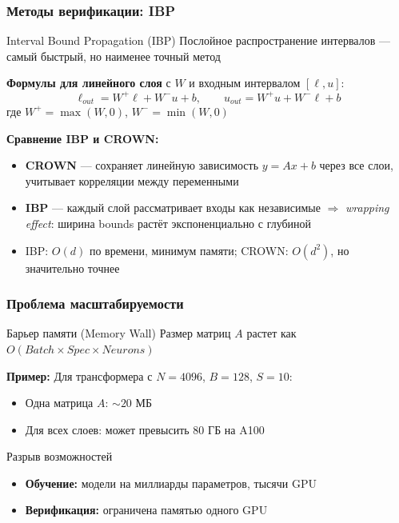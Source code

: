 \begin{frame}
\frametitle{Методы верификации: IBP}

\begin{block}{Interval Bound Propagation (IBP)}
Послойное распространение интервалов --- самый быстрый, но наименее точный метод
\end{block}

\vspace{0.3cm}

\textbf{Формулы для линейного слоя} с $W$ и входным интервалом $[\ell, u]$:
$$\ell_{out} = W^+ \ell + W^- u + b, \qquad u_{out} = W^+ u + W^- \ell + b$$
где $W^+ = \max(W, 0)$, $W^- = \min(W, 0)$

\vspace{0.3cm}

\textbf{Сравнение IBP и CROWN:}
\begin{itemize}
    \item \textbf{CROWN} --- сохраняет линейную зависимость $y = Ax + b$ через все слои, учитывает корреляции между переменными
    \item \textbf{IBP} --- каждый слой рассматривает входы как независимые $\Rightarrow$ \textit{wrapping effect}: ширина bounds растёт экспоненциально с глубиной
    \item IBP: $O(d)$ по времени, минимум памяти; CROWN: $O(d^2)$, но значительно точнее
\end{itemize}

\end{frame}

\begin{frame}
\frametitle{Проблема масштабируемости}

\begin{alertblock}{Барьер памяти (Memory Wall)}
Размер матриц $A$ растет как $O(Batch \times Spec \times Neurons)$
\end{alertblock}

\vspace{0.3cm}

\textbf{Пример:} Для трансформера с $N=4096$, $B=128$, $S=10$:
\begin{itemize}
    \item Одна матрица $A$: $\sim 20$ МБ
    \item Для всех слоев: может превысить 80 ГБ на A100
\end{itemize}

\vspace{0.3cm}

\begin{block}{Разрыв возможностей}
\begin{itemize}
    \item \textbf{Обучение:} модели на миллиарды параметров, тысячи GPU
    \item \textbf{Верификация:} ограничена памятью одного GPU
\end{itemize}
\end{block}

\end{frame}
